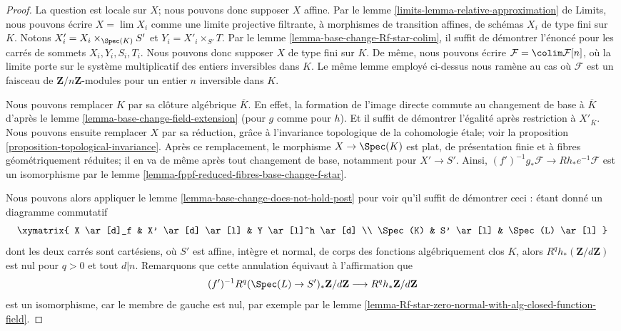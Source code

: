 \begin{proof}
La question est locale sur $X$; nous pouvons donc supposer $X$ affine.
Par le lemme \ref{limits-lemma-relative-approximation} de Limits,
nous pouvons écrire $X = \lim X_i$ comme une limite projective filtrante, à
morphismes de transition affines, de schémas $X_i$ de type fini sur $K$.
Notons $X'_i =  X_i \times_{\Spec(K)} S'$ et $Y_i = X'_i \times_{S'} T$.
Par le lemme \ref{lemma-base-change-Rf-star-colim},
il suffit de démontrer l'énoncé pour les carrés
de sommets $X_i, Y_i, S_i, T_i$.
Nous pouvons donc supposer $X$ de type fini sur $K$.
De même, nous pouvons écrire
$\mathcal{F} = \colim \mathcal{F}[n]$, où la limite porte
sur le système multiplicatif des entiers inversibles dans $K$.
Le même lemme employé ci-dessus nous ramène au cas où
$\mathcal{F}$ est un faisceau de $\mathbf{Z}/n\mathbf{Z}$-modules
pour un entier $n$ inversible dans $K$.

\medskip\noindent
Nous pouvons remplacer $K$ par sa clôture algébrique $\overline{K}$.
En effet, la formation de l'image directe commute au changement de base
à $\overline{K}$ d'après le
lemme \ref{lemma-base-change-field-extension} (pour $g$ comme pour
$h$). Et il suffit de démontrer l'égalité après
restriction à $X'_{\overline{K}}$. Nous pouvons ensuite remplacer
$X$ par sa réduction, grâce à l'invariance topologique de la cohomologie
étale; voir la
proposition \ref{proposition-topological-invariance}.
Après ce remplacement, le morphisme $X \to \Spec(K)$
est plat, de présentation finie et à fibres géométriquement réduites;
il en va de même après tout changement de base, notamment pour $X' \to S'$.
Ainsi, $(f')^{-1}g_*\mathcal{F} \to Rh_*e^{-1}\mathcal{F}$
est un isomorphisme par le lemme \ref{lemma-fppf-reduced-fibres-base-change-f-star}.

\medskip\noindent
Nous pouvons alors appliquer le
lemme \ref{lemma-base-change-does-not-hold-post}
pour voir qu'il suffit de démontrer ceci : étant donné un diagramme commutatif
$$
\xymatrix{
X \ar[d]_f & X' \ar[d] \ar[l] & Y \ar[l]^h \ar[d] \\
\Spec(K) & S' \ar[l] & \Spec(L) \ar[l]
}
$$
dont les deux carrés sont cartésiens, où $S'$ est affine, intègre et normal,
de corps des fonctions algébriquement clos $K$, alors
$R^qh_*(\mathbf{Z}/d\mathbf{Z})$ est nul pour $q > 0$ et tout $d | n$.
Remarquons que cette annulation équivaut à l'affirmation que
$$
(f')^{-1}R^q(\Spec(L) \to S')_*\mathbf{Z}/d\mathbf{Z}
\longrightarrow
R^qh_*\mathbf{Z}/d\mathbf{Z}
$$
est un isomorphisme, car le membre de gauche est nul, par exemple par le
lemme \ref{lemma-Rf-star-zero-normal-with-alg-closed-function-field}.


\end{proof}
